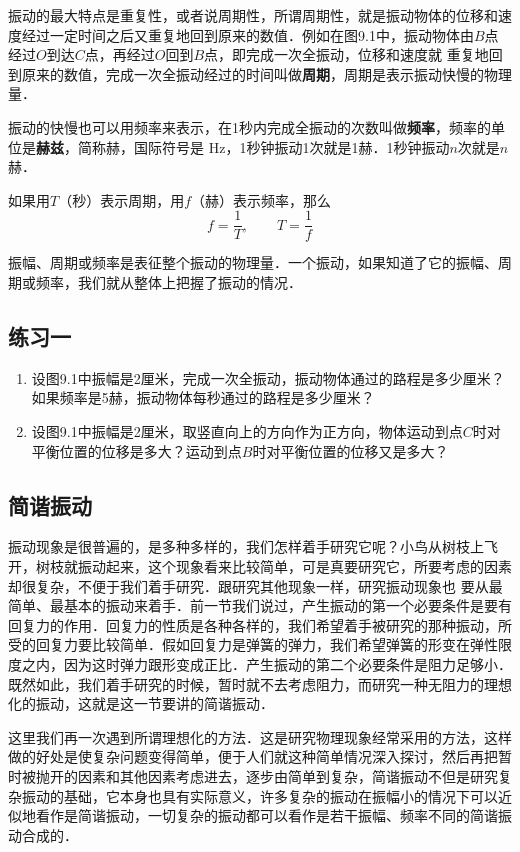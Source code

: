振动的最大特点是重复性，或者说周期性，所谓周期性，就是振动物体的位移和速度经过一定时间之后又重复地回到原来的数值．例如在图9.1中，振动物体由$B$点经过$O$到达$C$点，再经过$O$回到$B$点，即完成一次全振动，位移和速度就
重复地回到原来的数值，完成一次全振动经过的时间叫做\textbf{周期}，周期是表示振动快慢的物理量．

振动的快慢也可以用频率来表示，在1秒内完成全振动的次数叫做\textbf{频率}，频率的单位是\textbf{赫兹}，简称赫，国际符号是
Hz，1秒钟振动1次就是1赫．1秒钟振动$n$次就是$n$赫．

如果用$T$（秒）表示周期，用$f$（赫）表示频率，那么
\[f=\frac{1}{T},\qquad T=\frac{1}{f}\]

振幅、周期或频率是表征整个振动的物理量．一个振动，如果知道了它的振幅、周期或频率，我们就从整体上把握了振动的情况．

\subsection*{练习一}
\begin{enumerate}
    \item 设图9.1中振幅是2厘米，完成一次全振动，振动物体通过的路程是多少厘米？如果频率是5赫，振动物体每秒通过的路程是多少厘米？
    \item 设图9.1中振幅是2厘米，取竖直向上的方向作为正方向，物体运动到点$C$时对平衡位置的位移是多大？运动到点$B$时对平衡位置的位移又是多大？
\end{enumerate}


\subsection{简谐振动}
振动现象是很普遍的，是多种多样的，我们怎样着手研究它呢？小鸟从树枝上飞开，树枝就振动起来，这个现象看来比较简单，可是真要研究它，所要考虑的因素却很复杂，不便于我们着手研究．跟研究其他现象一样，研究振动现象也
要从最简单、最基本的振动来着手．前一节我们说过，产生振动的第一个必要条件是要有回复力的作用．回复力的性质是各种各样的，我们希望着手被研究的那种振动，所受的回复力要比较简单．假如回复力是弹簧的弹力，我们希望弹簧的形变在弹性限度之内，因为这时弹力跟形变成正比．产生振动的第二个必要条件是阻力足够小．既然如此，我们着手研究的时候，暂时就不去考虑阻力，而研究一种无阻力的理想化的振动，这就是这一节要讲的简谐振动．

这里我们再一次遇到所谓理想化的方法．这是研究物理现象经常采用的方法，这样做的好处是使复杂问题变得简单，便于人们就这种简单情况深入探讨，然后再把暂时被抛开的因素和其他因素考虑进去，逐步由简单到复杂，简谐振动不但是研究复杂振动的基础，它本身也具有实际意义，许多复杂的振动在振幅小的情况下可以近似地看作是简谐振动，一切复杂的振动都可以看作是若干振幅、频率不同的简谐振动合成的．

